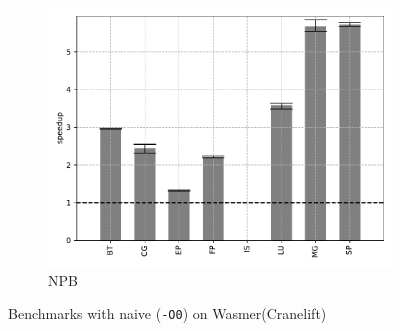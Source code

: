 \begin{figure}
\begin{subfigure}[t]{.45\textwidth}
        \includegraphics[width=\textwidth]
        {Images/6.1.RQ1/npb-wasmer-cranelift-naive.pdf}
        \caption{NPB}
    \end{subfigure}
    \caption{Benchmarks with naive (\texttt{-O0}) on Wasmer(Cranelift)}
    \label{fig:rq1-wasmer-cranelift-naive}
\end{figure}


